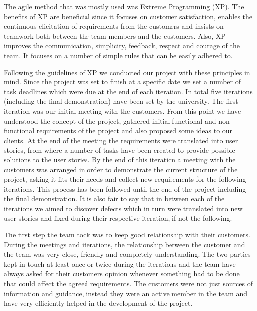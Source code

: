 \documentclass{l3proj}
\begin{document}
The agile method that was mostly used was Extreme Programming (XP). The benefits of XP are beneficial since it focuses on
customer satisfaction, enables the continuous elicitation of requirements from the customers and insists on teamwork
both between the team members and the customers. Also, XP improves the communication, simplicity, feedback, respect and
courage of the team. It focuses on a number of simple rules that can be easily adhered to.

Following the guidelines of XP we conducted our project with these principles in mind. Since the project was set to finish at a specific date
we set a number of task deadlines which were due at the end of each iteration. In total five iterations
(including the final demonstration) have been set by the university. The first iteration was our initial meeting with
the customers. From this point we have understood the concept of the project, gathered initial functional and non-functional
requirements of the project and also proposed some ideas to our clients. At the end of the meeting the requirements were
translated into user stories, from where a number of tasks have been created to provide possible solutions to the user stories.
By the end of this iteration a meeting with the customers was arranged in order to demonstrate the current structure of the
project, asking it fits their needs and collect new requirements for the following iterations. This process has been followed
until the end of the project including the final demonstration. It is also fair to say that in between each of the iterations we
aimed to discover defects which in turn were translated into new user stories and fixed during their respective iteration,
if not the following.

The first step the team took was to keep good relationship with their customers. During the meetings and iterations, the relationship
between the customer and the team was very close, friendly and completely understanding. The two parties kept in touch at least once or twice during the
iterations and the team have always asked for their customers opinion whenever something had to be done that could affect the agreed requirements.
The customers were not just sources of information and guidance, instead they were an active member in the team and have very
efficiently helped in the development of the project.
\end{document}
